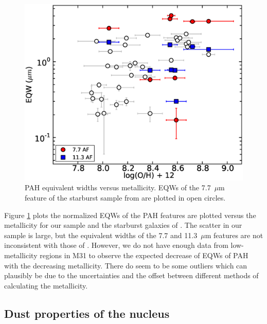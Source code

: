 \begin{figure}
\centering
\includegraphics[scale=0.27]{./oxyvseqw.eps}
\caption{ PAH equivalent widths versus metallicity. EQWs of the 7.7~$\mu$m feature of the starburst sample from \citet{Engelbracht_2008} are plotted in open circles.}
\label{metalicityVseqw}
\end{figure}

Figure \ref{metalicityVseqw} plots the normalized EQWs of the PAH features are plotted versus the metallicity for our sample and the starburst 
galaxies of \citet{Engelbracht_2008}. The scatter in our sample is large, but the 	
equivalent widths of the 7.7 and 11.3~$\mu$m features are not inconsistent with those of \citet{Engelbracht_2008}. 
However, we do not have enough data from low-metallicity regions in M31 to observe the expected decrease of EQWs of PAH with the decreasing 
metallicity.  There do seem to be some outliers which can plausibly be due to the uncertainties  and the offset between different methods of calculating the metallicity.  

\subsection{Dust properties of the nucleus}
\label{sect:nucleus}

%


